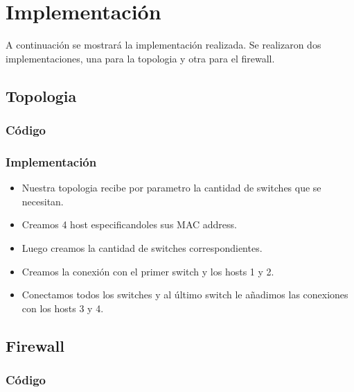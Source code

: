 \documentclass[titlepage,a4paper]{article}
\begin{document}
\section{Implementación}\label{sec:implementacion}
A continuación se mostrará la implementación realizada. Se realizaron dos implementaciones, una para la topologia y otra para el firewall.

\subsection{Topologia}
\subsubsection{Código}

\subsubsection{Implementación}
\begin{itemize}
    \item Nuestra topologia recibe por parametro la cantidad de switches que se necesitan. \item Creamos 4 host especificandoles sus MAC address.
    \item Luego creamos la cantidad de switches correspondientes.
    \item Creamos la conexión con el primer switch y los hosts 1 y 2.
    \item Conectamos todos los switches y al último switch le añadimos las conexiones con los hosts 3 y 4.
\end{itemize} 

\subsection{Firewall}
\subsubsection{Código}

\end{document}

